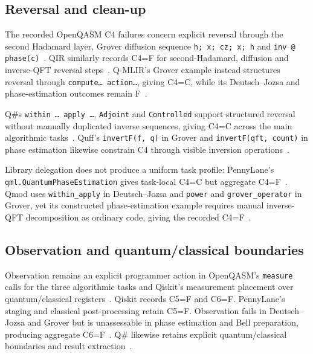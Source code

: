 \subsection{Reversal and clean-up}\label{subsec:system_assessments:reversal}
The recorded OpenQASM C4 failures concern explicit reversal through the second Hadamard layer, Grover diffusion sequence \texttt{h; x; cz; x; h} and \texttt{inv @ phase(c)}~\cite{cross2022openqasm3,kavadias2026qplSurveySupplementary}.
QIR similarly records C4=F for second-Hadamard, diffusion and inverse-QFT reversal steps~\cite{qir_alliance_qir_spec_repo,kavadias2026qplSurveySupplementary}.
Q-MLIR's Grover example instead structures reversal through \texttt{compute{\dots} action{\dots}}, giving C4=C, while its Deutsch--Jozsa and phase-estimation outcomes remain F~\cite{McCaskey2021MLIRDialectQASM,kavadias2026qplSurveySupplementary}.

Q\#s \texttt{within {\dots} apply {\dots}}, \texttt{Adjoint} and \texttt{Controlled} support structured reversal without manually duplicated inverse sequences, giving C4=C across the main algorithmic tasks~\cite{MicrosoftQSharpOverview,kavadias2026qplSurveySupplementary}.
Quff's \texttt{invertF(f, q)} in Grover and \texttt{invertF(qft, count)} in phase estimation likewise constrain C4 through visible inversion operations~\cite{wright2024quff,kavadias2026qplSurveySupplementary}.

Library delegation does not produce a uniform task profile: PennyLane's \texttt{qml.QuantumPhaseEstimation} gives task-local C4=C but aggregate C4=F~\cite{bergholm2018pennylane,kavadias2026qplSurveySupplementary}.
Qmod uses \texttt{within\_apply} in Deutsch--Jozsa and \texttt{power} and \texttt{grover\_operator} in Grover, yet its constructed phase-estimation example requires manual inverse-QFT decomposition as ordinary code, giving the recorded C4=F~\cite{vax2025qmodexpressivehighlevelquantum,kavadias2026qplSurveySupplementary}.

\subsection{Observation and quantum/classical boundaries}\label{subsec:system_assessments:observation}
Observation remains an explicit programmer action in OpenQASM's \texttt{measure} calls for the three algorithmic tasks and Qiskit's measurement placement over quantum/classical registers~\cite{cross2022openqasm3,aleksandrowicz2019qiskit,kavadias2026qplSurveySupplementary}.
Qiskit records C5=F and C6=F\@.
PennyLane's staging and classical post-processing retain C5=F\@.
Observation fails in Deutsch--Jozsa and Grover but is unassessable in phase estimation and Bell preparation, producing aggregate C6=F~\cite{bergholm2018pennylane,kavadias2026qplSurveySupplementary}.
Q\# likewise retains explicit quantum/classical boundaries and result extraction~\cite{MicrosoftQSharpOverview,kavadias2026qplSurveySupplementary}.

